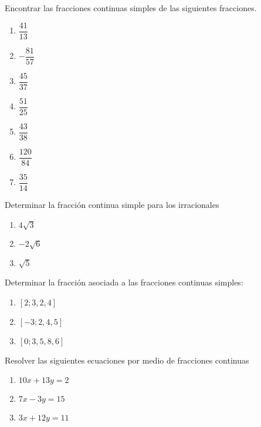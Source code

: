 \begin{exercise}
    Encontrar las fracciones continuas simples de las siguientes fracciones.
    \begin{multicols}{4}
        \begin{enumerate}
            \item $\dfrac{41}{13}$
            \item $-\dfrac{81}{57}$
            \item $\dfrac{45}{37}$
            \item $\dfrac{51}{25}$
            \item $\dfrac{43}{38}$
            \item $\dfrac{120}{84}$
            \item $\dfrac{35}{14}$
        \end{enumerate}
    \end{multicols}
\end{exercise}

\begin{exercise}
    Determinar la fracción continua simple para los irracionales
    \begin{multicols}{3}
        \begin{enumerate}
            \item $4\sqrt {3}$
            \item $-2\sqrt {6}$
            \item $\sqrt {5}$
        \end{enumerate}
    \end{multicols}
\end{exercise}

\begin{exercise}
    Determinar la fracción asociada a las fracciones continuas simples:
    \begin{multicols}{3}
        \begin{enumerate}
            \item $[2; 3,2,4]$
            \item $[-3; 2,4,5]$
            \item $[0; 3,5,8,6]$
        \end{enumerate}
    \end{multicols}
\end{exercise}

\begin{exercise}
    Resolver las siguientes ecuaciones por medio de fracciones continuas
    \begin{multicols}{3}
        \begin{enumerate}
            \item $10x + 13y = 2$
            \item $7x - 3y = 15$
            \item $3x + 12y = 11$
        \end{enumerate}
    \end{multicols}
\end{exercise}

